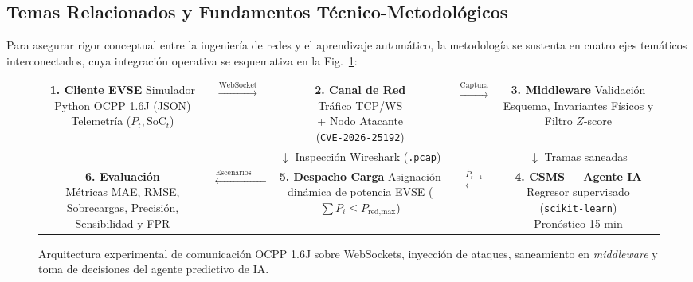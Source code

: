 \documentclass[conference]{IEEEtran}
\begin{document}
\subsection{Temas Relacionados y Fundamentos Técnico-Metodológicos}

Para asegurar rigor conceptual entre la ingeniería de redes y el aprendizaje automático, la metodología se sustenta en cuatro ejes temáticos interconectados, cuya integración operativa se esquematiza en la Fig.~\ref{fig:arquitectura}:

\begin{figure}[t]
\centering
\footnotesize
\begin{tabular}{c c c c c}
\fbox{\parbox{2.7cm}{\centering \textbf{1. Cliente EVSE}\\Simulador Python\\OCPP 1.6J (JSON)\\Telemetría ($P_t, \text{SoC}_t$)}}
& $\xrightarrow{\text{WebSocket}}$ &
\fbox{\parbox{2.8cm}{\centering \textbf{2. Canal de Red}\\Tráfico TCP/WS\\+ Nodo Atacante\\(\texttt{CVE-2026-25192})}}
& $\xrightarrow{\text{Captura}}$ &
\fbox{\parbox{2.8cm}{\centering \textbf{3. Middleware}\\Validación Esquema,\\Invariantes Físicos\\y Filtro $Z$-score}}
\\
& & $\downarrow$ \scriptsize{Inspección Wireshark (\texttt{.pcap})} & & $\downarrow$ \scriptsize{Tramas saneadas} \\
\fbox{\parbox{2.7cm}{\centering \textbf{6. Evaluación}\\Métricas MAE, RMSE,\\Sobrecargas, Precisión,\\Sensibilidad y FPR}}
& $\xleftarrow{\text{Escenarios E1--E3}}$ &
\fbox{\parbox{2.8cm}{\centering \textbf{5. Despacho Carga}\\Asignación dinámica\\de potencia EVSE\\($\sum P_i \le P_{\text{red,max}}$)}}
& $\xleftarrow{\hat{P}_{t+1}}$ &
\fbox{\parbox{2.8cm}{\centering \textbf{4. CSMS + Agente IA}\\Regresor supervisado\\(\texttt{scikit-learn})\\Pronóstico 15 min}}
\end{tabular}
\caption{Arquitectura experimental de comunicación OCPP 1.6J sobre WebSockets, inyección de ataques, saneamiento en \textit{middleware} y toma de decisiones del agente predictivo de IA.}
\label{fig:arquitectura}
\end{figure}
\end{document}
